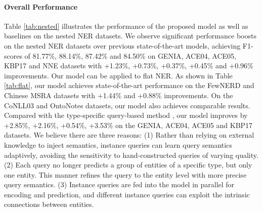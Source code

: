 \documentclass[11pt]{article}
\begin{document}
\paragraph{Overall Performance} Table \ref{tab:nested} illustrates the performance of the proposed model as well as baselines on the nested NER datasets. We observe significant performance boosts on the nested NER datasets over previous state-of-the-art models, achieving F1-scores of 81.77\%, 88.14\%, 87.42\% and 84.50\% on GENIA, ACE04, ACE05, KBP17 and NNE datasets with +1.23\%, +0.73\%, +0.37\%, +0.45\% and +0.96\% improvements.
Our model can be applied to flat NER. As shown in Table \ref{tab:flat}, our model achieves state-of-the-art performance on the FewNERD and Chinese MSRA datasets with +1.44\% and +0.88\% improvements. On the CoNLL03 and OntoNotes datasets, our model also achieves comparable results.
Compared with the type-specific query-based method \citep{li-etal-2020-unified}, our model improves by +2.85\%, +2.16\%, +0.54\%, +3.53\% on the GENIA, ACE04, ACE05 and KBP17 datasets. We believe there are three reasons: (1) Rather than relying on external knowledge to inject semantics, instance queries can learn query semantics adaptively, avoiding the sensitivity to hand-constructed queries of varying quality. (2) Each query no longer predicts a group of entities of a specific type, but only one entity. 
This manner refines the query to the entity level with more precise query semantics.
(3) Instance queries are fed into the model in parallel for encoding and prediction, and different instance queries can exploit the intrinsic connections between entities.
\end{document}
